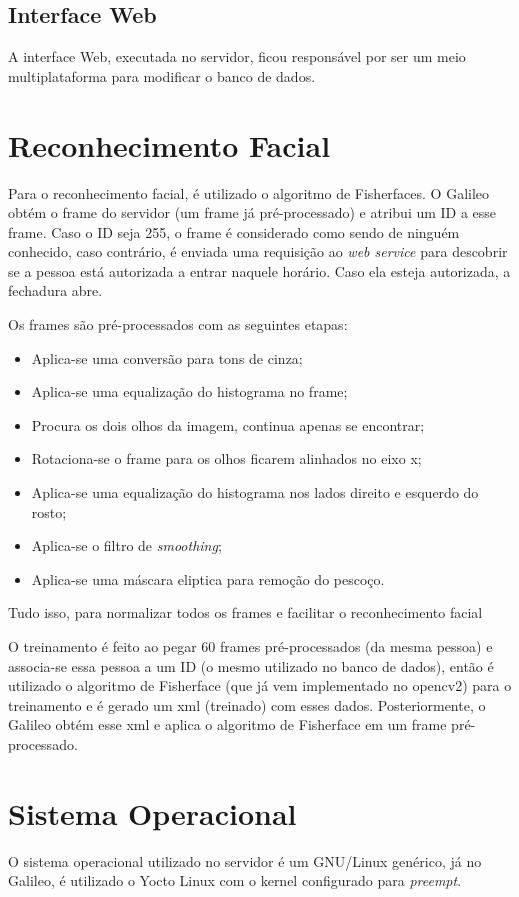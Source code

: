 \documentclass[12pt]{article}
\begin{document}
\subsection{Interface Web}
    A interface Web, executada no servidor, ficou responsável por ser um meio
    multiplataforma para modificar o banco de dados.

\section{Reconhecimento Facial}
    Para o reconhecimento facial, é utilizado o algoritmo de Fisherfaces. O
    Galileo obtém o frame do servidor (um frame já pré-processado) e atribui um
    ID a esse frame. Caso o ID seja 255, o frame é considerado como sendo de
    ninguém conhecido, caso contrário, é enviada uma requisição ao
    \textit{web service} para descobrir se a pessoa está autorizada a entrar
    naquele horário. Caso ela esteja autorizada, a fechadura abre.

    Os frames são pré-processados com as seguintes etapas:
    \begin{itemize}
        \item Aplica-se uma conversão para tons de cinza;
        \item Aplica-se uma equalização do histograma no frame;
        \item Procura os dois olhos da imagem, continua apenas se encontrar;
        \item Rotaciona-se o frame para os olhos ficarem alinhados no eixo x;
        \item Aplica-se uma equalização do histograma nos lados direito e
        esquerdo do rosto;
        \item Aplica-se o filtro de \textit{smoothing};
        \item Aplica-se uma máscara eliptica para remoção do pescoço.
    \end{itemize}
     Tudo isso, para normalizar todos os frames e facilitar o reconhecimento
     facial

     O treinamento é feito ao pegar 60 frames pré-processados (da mesma pessoa)
     e associa-se essa pessoa a um ID (o mesmo utilizado no banco de dados),
     então é utilizado o algoritmo de Fisherface (que já vem implementado no
     opencv2) para o treinamento e é gerado um xml (treinado) com esses dados.
     Posteriormente, o Galileo obtém esse xml e aplica o algoritmo de Fisherface
     em um frame pré-processado.

\section{Sistema Operacional}
    O sistema operacional utilizado no servidor é um GNU/Linux genérico, já no
    Galileo, é utilizado o Yocto Linux com o kernel configurado para
    \textit{preempt}.
\end{document}
